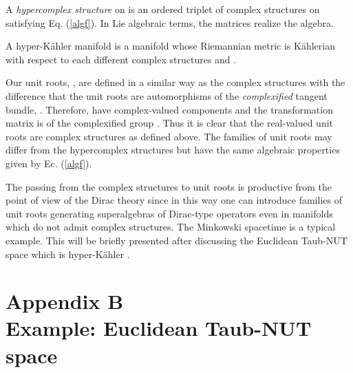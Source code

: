 \documentclass[a4paper,12pt]{article}
\begin{document}
A {\em hypercomplex structure} on \coordHE{} is an ordered triplet \coordHE{} of complex structures on \coordHE{} satisfying Eq. (\ref{algf}). 
In Lie algebraic terms, the matrices \coordHE{} realize 
the \coordHE{} algebra.
\begin{defin}
A hyper-K\" ahler manifold is a manifold whose Riemannian metric is 
K\"ahlerian with respect to each different complex structures 
\coordHE{} and \coordHE{}. 
\end{defin}

Our unit roots, \coordHE{}, are defined in a similar way as the complex structures 
with the difference that the unit roots are automorphisms of the 
{\em complexified} tangent bundle, 
\coordHE{}. 
Therefore, \coordHE{} have complex-valued components and the transformation 
matrix \coordHE{} is of the complexified group \coordHE{}. Thus 
it is clear that the real-valued unit roots are complex structures as defined 
above. The families of unit roots may differ from the hypercomplex structures 
but have the same algebraic properties given by Ec. (\ref{algf}). 

The passing from the complex structures to unit roots is productive 
from the point of view of the Dirac theory since in this way 
one can introduce families of unit roots generating superalgebras of 
Dirac-type operators even in manifolds which do not admit complex structures.   
The Minkowski spacetime is a typical example. This will be briefly presented 
after discussing the Euclidean Taub-NUT space which is hyper-K\" ahler
\cite{AH, GR}.  

\setcounter{equation}{0} \renewcommand{\theequation}
{B.\arabic{equation}}

\section*{Appendix B\\Example: Euclidean Taub-NUT space}
\end{document}
